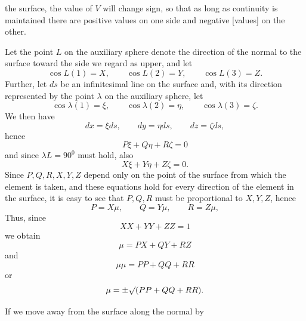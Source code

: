 %
the surface, the value of $V$ will change sign, so that as long as continuity is maintained there are positive values on one side and negative [values] on the other.

Let the point $L$ on the auxiliary sphere denote the direction of the normal to the surface toward the side we regard as upper, and let
\[
\cos L(1)=X,\qquad\cos L(2)=Y,\qquad\cos L(3)=Z.
\]
Further, let $ds$ be an infinitesimal line on the surface and, with its direction represented by the point $\lambda$ on the auxiliary sphere, let
\[
\cos\lambda(1)=\xi,\qquad\cos\lambda(2)=\eta,\qquad\cos\lambda(3)=\zeta.
\]
We then have
\[
dx=\xi ds,\qquad dy=\eta ds,\qquad dz=\zeta ds,
\]
hence
\[
P\xi+Q\eta+R\zeta=0
\]
and since $\lambda L=90^{0}$ must hold, also
\[
X\xi+Y\eta+Z\zeta=0.
\]
Since $P,Q,R,X,Y,Z$ depend only on the point of the surface from which the element is taken, and these equations hold for every direction of the element in the surface, it is easy to see that $P,Q,R$ must be proportional to $X,Y,Z$, hence
\[
P=X\mu,\qquad Q=Y\mu,\qquad R=Z\mu,
\]
Thus, since
\[
XX+YY+ZZ=1
\]
we obtain
\[
\mu=PX+QY+RZ
\]
and
\[
\mu\mu=PP+QQ+RR
\]
or
\[
\mu=\pm\mathord{\surd}(PP+QQ+RR).
\]

If we move away from the surface along the normal by\space%
